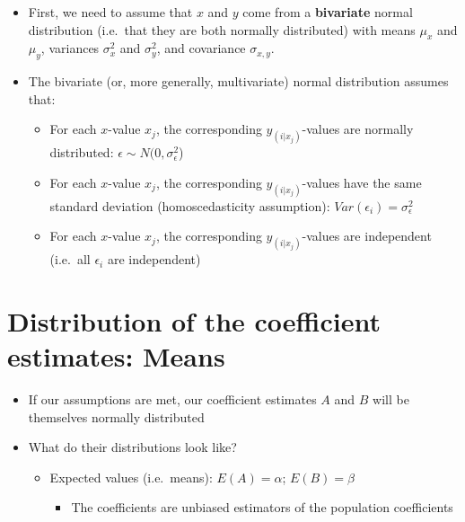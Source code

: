 \documentclass[]{article}
\providecommand{\tightlist}{%
  \setlength{\itemsep}{0pt}\setlength{\parskip}{0pt}}
\begin{document}
\begin{itemize}
\tightlist
\item
  First, we need to assume that \(x\) and \(y\) come from a
  \textbf{bivariate} normal distribution (i.e.~that they are both
  normally distributed) with means \(\mu_x\) and \(\mu_y\), variances
  \(\sigma^2_x\) and \(\sigma^2_y\), and covariance \(\sigma_{x,y}\).
\item
  The bivariate (or, more generally, multivariate) normal distribution
  assumes that:

  \begin{itemize}
  \tightlist
  \item
    For each \(x\)-value \(x_j\), the corresponding
    \(y_{(i|x_j)}\)-values are normally distributed:
    \(\epsilon \sim N(0, \sigma_{\epsilon}^2\))
  \item
    For each \(x\)-value \(x_j\), the corresponding
    \(y_{(i|x_j)}\)-values have the same standard deviation
    (homoscedasticity assumption):
    \(Var(\epsilon_i) = \sigma_{\epsilon}^2\)
  \item
    For each \(x\)-value \(x_j\), the corresponding
    \(y_{(i|x_j)}\)-values are independent (i.e.~all \(\epsilon_i\) are
    independent)
  \end{itemize}
\end{itemize}

\section{Distribution of the coefficient estimates:
Means}\label{distribution-of-the-coefficient-estimates-means}

\begin{itemize}
\tightlist
\item
  If our assumptions are met, our coefficient estimates \(A\) and \(B\)
  will be themselves normally distributed
\item
  What do their distributions look like?

  \begin{itemize}
  \tightlist
  \item
    Expected values (i.e.~means): \(E(A) = \alpha\); \(E(B) = \beta\)

    \begin{itemize}
    \tightlist
    \item
      The coefficients are unbiased estimators of the population
      coefficients
    \end{itemize}
  \end{itemize}
\end{itemize}
\end{document}
